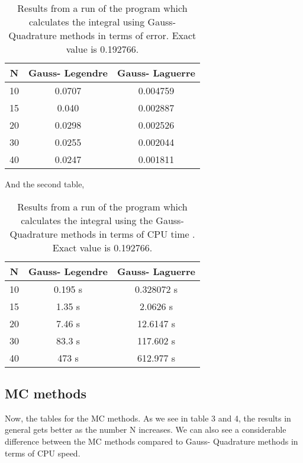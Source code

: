 \documentclass{article}
\begin{document}
		\begin{table}[h]
			\centering
			\caption{Results from a run of the program which calculates the integral using Gauss- Quadrature methods in terms of error. Exact value is 0.192766.}
			\label{table: Error results Gauss-Quarature}
			\begin{tabular}{|c|c|c|}
\hline
\textbf{N} 	&	\textbf{Gauss- Legendre}	&	\textbf{Gauss- Laguerre} \\\hline 
10 	&	0.0707	&	0.004759					\\ \hline
15 	&	0.040	&	0.002887				\\ \hline
20 	&	0.0298	&	0.002526			\\ \hline
30 	&	0.0255	&	0.002044				\\ \hline
40 	&	0.0247	&	0.001811					\\ \hline
			\end{tabular}
		\end{table}
And the second table, 
		\begin{table}[h]
			\centering
			\caption{Results from a run of the program which calculates the integral using the Gauss- Quadrature methods in terms of CPU time . Exact value is 0.192766.}
			\label{table: Error results Gauss-Quarature}
			\begin{tabular}{|c|c|c|}
\hline
\textbf{N} 	&	\textbf{Gauss- Legendre}	&	\textbf{Gauss- Laguerre} \\\hline 
10 	&	0.195 s	& 0.328072 s					\\ \hline
15 	&	1.35 s	& 2.0626 s 					\\ \hline
20 	&	7.46 s	& 12.6147 s					\\ \hline
30 	&	83.3 s	& 117.602 s						\\ \hline
40 	&	473 s	& 612.977 s						\\ \hline

			\end{tabular}
		\end{table}


	
	\subsection{MC methods}
        
        Now, the tables for the MC methods. As we see in table 3 and 4, the results in general gets better as the number N increases. We can also see a considerable difference between the MC methods compared to Gauss- Quadrature methods in terms of CPU speed. \\
        
\end{document}
